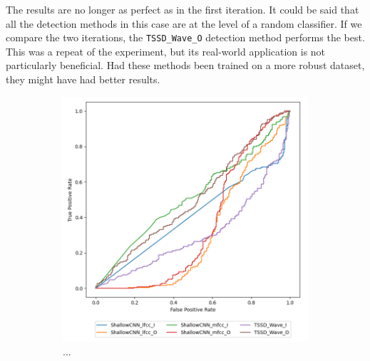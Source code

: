 The results are no longer as perfect as in the first iteration. It could be said that all the detection methods in this case are at the level of a random classifier. If we compare the two iterations, the \texttt{TSSD\_Wave\_O} detection method performs the best. This was a repeat of the experiment, but its real-world application is not particularly beneficial. Had these methods been trained on a more robust dataset, they might have had better results.

\begin{figure}[H]
    \begin{subfigure}[h]{0.5\linewidth}
        \centering
        \includegraphics[width=1\linewidth]{other-fig/tests/asv_methods.png}
        \caption{...}
    \end{subfigure}
    \hfill
    \begin{subfigure}[h]{0.5\linewidth}
        \centering

\end{subfigure}
\end{figure}
